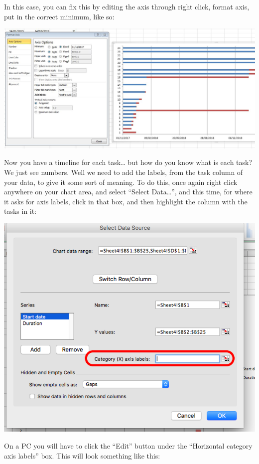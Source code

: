 \documentclass[
]{book}
\begin{document}
In this case, you can fix this by editing the axis through right click, format axis, put in the correct minimum, like so:

\includegraphics{imgs/Fixing_Gantt.jpg}

Now you have a timeline for each task\ldots{} but how do you know what is each task? We just see numbers. Well we need to add the labels, from the task column of your data, to give it some sort of meaning. To do this, once again right click anywhere on your chart area, and select ``Select Data\ldots{}'', and this time, for where it asks for axis labels, click in that box, and then highlight the column with the tasks in it:

\includegraphics{imgs/axis_labels_gantt.png}

On a PC you will have to click the ``Edit'' button under the ``Horizontal category axis labels'' box. This will look something like this:
\end{document}
